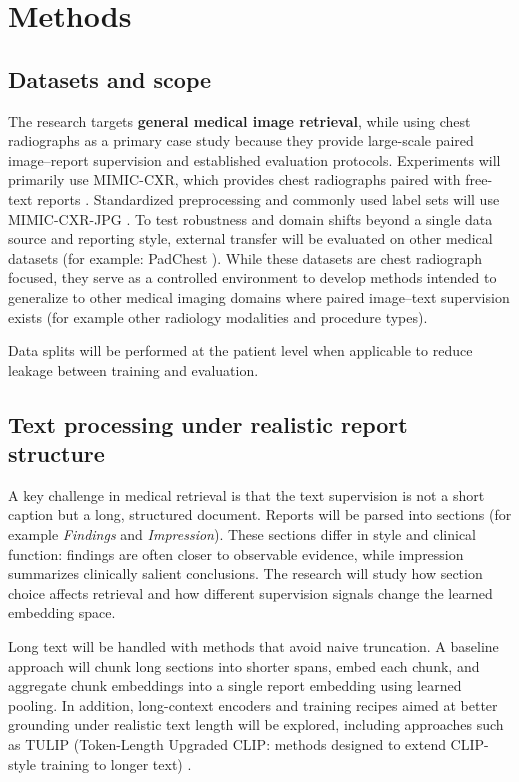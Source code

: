 \documentclass[11pt,a4paper]{article}
\begin{document}
\section{Methods}
\subsection{Datasets and scope}
The research targets \textbf{general medical image retrieval}, while using chest radiographs as a primary case study because they provide large-scale paired image--report supervision and established evaluation protocols. Experiments will primarily use MIMIC-CXR, which provides chest radiographs paired with free-text reports \cite{johnson2019mimiccxr}. Standardized preprocessing and commonly used label sets will use MIMIC-CXR-JPG \cite{johnson2019mimiccxrjpglargepubliclyavailable}. To test robustness and domain shifts beyond a single data source and reporting style, external transfer will be evaluated on other medical datasets (for example: PadChest \cite{Bustos_2020}). While these datasets are chest radiograph focused, they serve as a controlled environment to develop methods intended to generalize to other medical imaging domains where paired image--text supervision exists (for example other radiology modalities and procedure types).

Data splits will be performed at the patient level when applicable to reduce leakage between training and evaluation.

\subsection{Text processing under realistic report structure}
A key challenge in medical retrieval is that the text supervision is not a short caption but a long, structured document. Reports will be parsed into sections (for example \textit{Findings} and \textit{Impression}). These sections differ in style and clinical function: findings are often closer to observable evidence, while impression summarizes clinically salient conclusions. The research will study how section choice affects retrieval and how different supervision signals change the learned embedding space.

Long text will be handled with methods that avoid naive truncation. A baseline approach will chunk long sections into shorter spans, embed each chunk, and aggregate chunk embeddings into a single report embedding using learned pooling. In addition, long-context encoders and training recipes aimed at better grounding under realistic text length will be explored, including approaches such as TULIP (Token-Length Upgraded CLIP: methods designed to extend CLIP-style training to longer text) \cite{najdenkoska2025tuliptokenlengthupgradedclip}.
\end{document}
